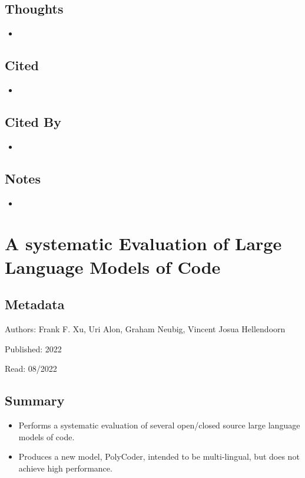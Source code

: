 \documentclass{article}
\begin{document}
\subsection*{Thoughts}
\begin{itemize}
\item
\end{itemize}

\subsection*{Cited}
\begin{itemize}
\item
\end{itemize}

\subsection*{Cited By}
\begin{itemize}
\item
\end{itemize}

\subsection*{Notes}

\begin{itemize}
	\item
\end{itemize}

\pagebreak


\section*{A systematic Evaluation of Large Language Models of Code}

\subsection*{Metadata}

\noindent Authors: Frank F. Xu, Uri Alon, Graham Neubig, Vincent Josua Hellendoorn

\noindent Published: 2022

\noindent Read: 08/2022

\subsection*{Summary}
\begin{itemize}
\item Performs a systematic evaluation of several open/closed source large language models of code.
\item Produces a new model, PolyCoder, intended to be multi-lingual, but does not achieve high performance.
\end{itemize}
\end{document}
